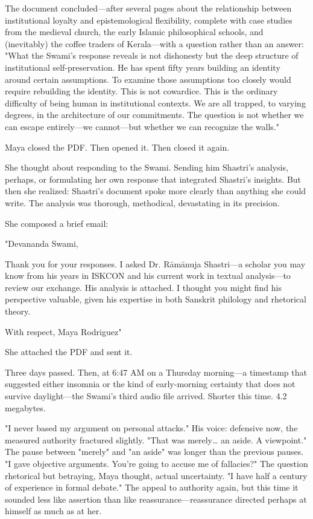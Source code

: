 \documentclass[12pt,twoside]{book}
\begin{document}
The document concluded—after several pages about the relationship between institutional loyalty and epistemological flexibility, complete with case studies from the medieval church, the early Islamic philosophical schools, and (inevitably) the coffee traders of Kerala—with a question rather than an answer: "What the Swami's response reveals is not dishonesty but the deep structure of institutional self-preservation. He has spent fifty years building an identity around certain assumptions. To examine those assumptions too closely would require rebuilding the identity. This is not cowardice. This is the ordinary difficulty of being human in institutional contexts. We are all trapped, to varying degrees, in the architecture of our commitments. The question is not whether we can escape entirely—we cannot—but whether we can recognize the walls."

Maya closed the PDF. Then opened it. Then closed it again.

She thought about responding to the Swami. Sending him Shastri's analysis, perhaps, or formulating her own response that integrated Shastri's insights. But then she realized: Shastri's document spoke more clearly than anything she could write. The analysis was thorough, methodical, devastating in its precision.

She composed a brief email:

"Devananda Swami,

Thank you for your responses. I asked Dr. Rāmānuja Shastri—a scholar you may know from his years in ISKCON and his current work in textual analysis—to review our exchange. His analysis is attached. I thought you might find his perspective valuable, given his expertise in both Sanskrit philology and rhetorical theory.

With respect, Maya Rodriguez"

She attached the PDF and sent it.

Three days passed. Then, at 6:47 AM on a Thursday morning—a timestamp that suggested either insomnia or the kind of early-morning certainty that does not survive daylight—the Swami's third audio file arrived. Shorter this time. 4.2 megabytes.

"I never based my argument on personal attacks." His voice: defensive now, the measured authority fractured slightly. "That was merely\ldots{} an aside. A viewpoint." The pause between "merely" and "an aside" was longer than the previous pauses. "I gave objective arguments. You're going to accuse me of fallacies?" The question rhetorical but betraying, Maya thought, actual uncertainty. "I have half a century of experience in formal debate." The appeal to authority again, but this time it sounded less like assertion than like reassurance—reassurance directed perhaps at himself as much as at her.
\end{document}
